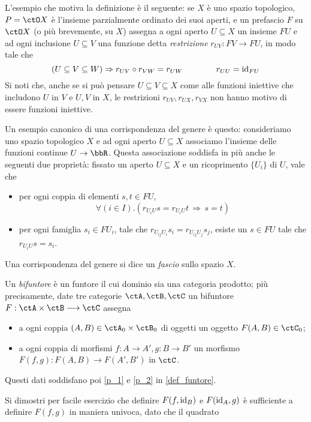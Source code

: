 L'esempio che motiva la definizione è il seguente: se \(X\) è uno spazio topologico, \(P=\ctO X\) è l'insieme parzialmente ordinato dei suoi aperti, e un prefascio \(F\) su \(\ctO X\) (o più brevemente, su \(X\)) assegna a ogni aperto \(U\subseteq X\) un insieme \(FU\) e ad ogni inclusione \(U\subseteq V\) una funzione detta \emph{restrizione} \(r_{UV} : FV \to FU\), in modo tale che
\[(U\subseteq V\subseteq W) \Rightarrow r_{UV}\circ r_{VW} = r_{UW} \qquad\qquad r_{UU} = \mathrm{id}_{FU}\]
Si noti che, anche se si può pensare \(U\subseteq V\subseteq X\) come alle funzioni iniettive che includono \(U\) in \(V\) e \(U,V\) in \(X\), le restrizioni \(r_{UV}, r_{UX}, r_{VX}\) non hanno motivo di essere funzioni iniettive.

Un esempio canonico di una corrispondenza del genere è questo: consideriamo uno spazio topologico \(X\) e ad ogni aperto \(U\subseteq X\) associamo l'insieme delle funzioni continue \(U\to \bbR\). Questa associazione soddisfa in più anche le seguenti due proprietà: fissato un aperto \(U\subseteq X\) e un ricoprimento \(\{U_i\}\) di \(U\), vale che
\begin{itemize}
	\item per ogni coppia di elementi \(s,t \in FU\),
	      \[\forall (i \in I).(r_{U_iU}s = r_{U_iU} t \,\Rightarrow\, s=t)\]
	\item per ogni famiglia \(s_i \in FU_i\), tale che \(r_{U_{ij}U_i}s_i = r_{U_{ij}U_j}s_j\), esiste un \(s\in FU\) tale che \(r_{U_iU}s=s_i\).
\end{itemize}
Una corrispondenza del genere si dice un \emph{fascio} sullo spazio \(X\).
\begin{definition}
	Un \emph{bifuntore} è un funtore il cui dominio sia una categoria prodotto; più precisamente, date tre categorie \(\ctA,\ctB,\ctC\) un bifuntore \(F : \ctA \times \ctB \fun \ctC\) assegna
	\begin{itemize}
		\item a ogni coppia \((A,B)\in \ctA_0\times\ctB_0\) di oggetti un oggetto \(F(A,B) \in\ctC_0\);
		\item a ogni coppia di morfismi \(f : A\to A', g : B\to B'\) un morfismo \(F(f,g) : F(A,B)\to F(A',B')\) in \(\ctC\).
	\end{itemize}
	Questi dati soddisfano poi \ref{p_1} e \ref{p_2} in \ref{def_funtore}.
\end{definition}
Si dimostri per facile esercizio che definire \(F(f,\mathrm{id}_B)\) e \(F(\mathrm{id}_A,g)\) è sufficiente a definire \(F(f,g)\) in maniera univoca, dato che il quadrato
